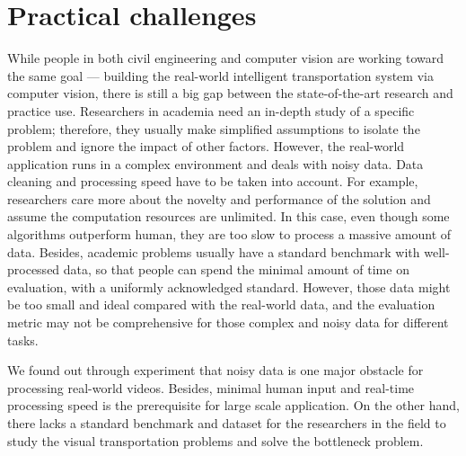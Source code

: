 \section{Practical challenges}
\label{sec:intro-cv}

While people in both civil engineering and computer vision are working toward the same goal --- building the real-world intelligent transportation system via computer vision, there is still a big gap between the state-of-the-art research and practice use.
Researchers in academia need an in-depth study of a specific problem; therefore, they usually make simplified assumptions to isolate the problem and ignore the impact of other factors. 
However, the real-world application runs in a complex environment and deals with noisy data. Data cleaning and processing speed have to be taken into account.
For example, researchers care more about the novelty and performance of the solution and assume the computation resources are unlimited. 
In this case, even though some algorithms outperform human, they are too slow to process a massive amount of data. 
Besides, academic problems usually have a standard benchmark with well-processed data, so that people can spend the minimal amount of time on evaluation, with a uniformly acknowledged standard.
However, those data might be too small and ideal compared with the real-world data, and the evaluation metric may not be comprehensive for those complex and noisy data for different tasks.

We found out through experiment that noisy data is one major obstacle for processing real-world videos. 
Besides, minimal human input and real-time processing speed is the prerequisite for large scale application.
On the other hand, there lacks a standard benchmark and dataset for the researchers in the field to study the visual transportation problems and solve the bottleneck problem.
